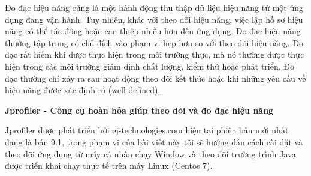 Đo đạc hiệu năng cũng là một hành động thu thập dữ liệu hiệu năng từ một ứng dụng đang vận hành. Tuy nhiên, khác với theo dõi hiệu năng, việc lập hồ sơ hiệu năng có thể tác động hoặc can thiệp nhiều hơn đến ứng dụng. Đo đạc hiệu năng thường tập trung có chủ đích vào phạm vi hẹp hơn so với theo dõi hiệu năng. Đo đạc rất hiếm khi được thực hiện trong môi trường thực, mà nó thường được thực hiện trong các môi trường giám định chất lượng, kiểm thử hoặc phát triển. Đo đạc thường chỉ xảy ra sau hoạt động theo dõi kết thúc hoặc khi những yêu cầu về hiệu năng được xác định rõ (well-defined).

\textbf{Jprofiler - Công cụ hoàn hỏa giúp theo dõi và đo đạc hiệu năng}

Jprofiler được phát triển bởi ej-technologies.com  hiện tại phiên bản mới nhất đang là bản 9.1, trong phạm vi của bài viết này tôi sẽ hướng dẫn cách cài đặt và  theo dõi ứng dụng từ máy cá nhân chạy Window và theo dõi trường trình Java được triển khai chạy thực tế trên máy Linux (Centos 7).
